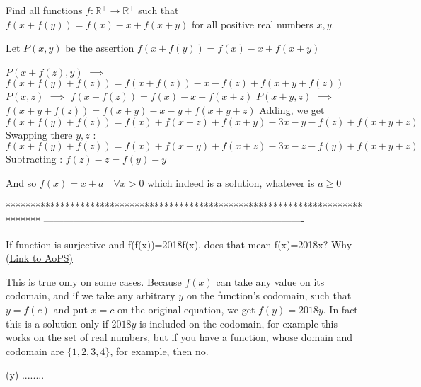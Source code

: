 \begin{solution}
	\begin{tcolorbox}Find all functions $ f: \mathbb{R^{+}}\to \mathbb{R^{+}}$ such that $f(x+f(y))=f(x)-x+f(x+y)$ for all positive real numbers $x,y$.\end{tcolorbox}
Let $P(x,y)$ be the assertion $f(x+f(y))=f(x)-x+f(x+y)$

$P(x+f(z),y)$ $\implies$ $f(x+f(y)+f(z))=f(x+f(z))-x-f(z)+f(x+y+f(z))$
$P(x,z)$ $\implies$ $f(x+f(z))=f(x)-x+f(x+z)$
$P(x+y,z)$ $\implies$ $f(x+y+f(z))=f(x+y)-x-y+f(x+y+z)$
Adding, we get $f(x+f(y)+f(z))=f(x)+f(x+z)+f(x+y)-3x-y-f(z)+f(x+y+z)$
Swapping there $y,z$ : $f(x+f(y)+f(z))=f(x)+f(x+y)+f(x+z)-3x-z-f(y)+f(x+y+z)$
Subtracting : $f(z)-z=f(y)-y$

And so $\boxed{f(x)=x+a\quad\forall x>0}$ which indeed is a solution, whatever is $a\ge 0$


\end{solution}
*******************************************************************************
-------------------------------------------------------------------------------

\begin{problem}
	If function is surjective and f(f(x))=2018f(x), does that mean f(x)=2018x? Why
	\flushright \href{https://artofproblemsolving.com/community/c6h1569295}{(Link to AoPS)}
\end{problem}



\begin{solution}
	This is true only on some cases. Because $f(x)$ can take any value on its codomain, and if we take any arbitrary $y$ on the function's codomain, such that $y=f(c)$ and put $x=c$ on the original equation, we get $f(y)=2018y$. In fact this is a solution only if $2018y$ is included on the codomain, for example this works on the set of real numbers, but if you have a function, whose domain and codomain are $\{ 1,2,3,4\}$, for example, then no.
\end{solution}



\begin{solution}
	(y) ........
\end{solution}



